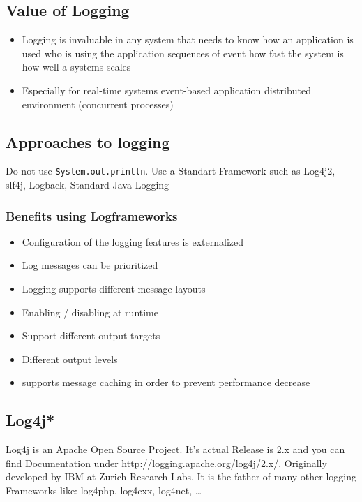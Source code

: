 \documentclass[10pt]{article}
\begin{document}
	\subsection{Value of Logging}
	\begin{itemize}
		\item Logging is invaluable in any system that needs to know how 
			\subitem an application is used
			\subitem who is using the application
			\subitem sequences of event
			\subitem how fast the system is 
			\subitem how well a systems scales
		\item Especially for 
			\subitem real-time systems
			\subitem event-based application 
			\subitem distributed environment 
			\subitem (concurrent processes)
	\end{itemize}
	
	\subsection{Approaches to logging}
	Do not use \texttt{System.out.println}. Use a Standart Framework such as Log4j2, slf4j, Logback, Standard Java Logging
	\subsubsection{Benefits using Logframeworks}
	\begin{itemize}
		\item Configuration of the logging features is externalized
		\item Log messages can be prioritized
		\item Logging supports different message layouts
		\item Enabling / disabling at runtime
		\item Support different output targets
		\item  Different output levels
		\item supports message caching in order to prevent performance decrease
	\end{itemize}
	
	\subsection{Log4j*}
    Log4j is an Apache Open Source Project. It's actual Release is 2.x and you can find Documentation under http://logging.apache.org/log4j/2.x/. Originally developed by IBM at Zurich Research Labs. It is the father of many other logging Frameworks like: log4php, log4cxx, log4net, \dots
    
\end{document}
